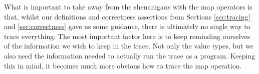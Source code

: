 
        What is important to take away from the shenanigans with the map operators is that, whilst our definitions and correctness assertions from Sections \ref{sec:tracing} and \ref{sec:correctness} gave us some guidance, there is ultimately no single way to trace everything.
        The most important factor here is to keep reminding ourselves of the information we wish to keep in the trace.
        Not only the value types, but we also need the information needed to actually run the trace as a program.
        Keeping this in mind, it becomes much more obvious how to trace the map operation.
